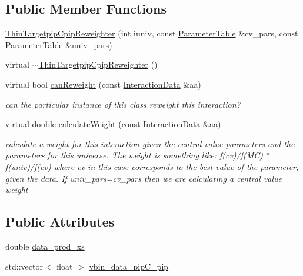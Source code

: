 \subsection*{Public Member Functions}
\begin{DoxyCompactItemize}
\item 
\hyperlink{class_neutrino_flux_reweight_1_1_thin_targetpip_cpip_reweighter_a4d91e1d701f6673a84b240c75e57645b}{Thin\-Targetpip\-Cpip\-Reweighter} (int iuniv, const \hyperlink{class_neutrino_flux_reweight_1_1_parameter_table}{Parameter\-Table} \&cv\-\_\-pars, const \hyperlink{class_neutrino_flux_reweight_1_1_parameter_table}{Parameter\-Table} \&univ\-\_\-pars)
\item 
virtual \hyperlink{class_neutrino_flux_reweight_1_1_thin_targetpip_cpip_reweighter_a3568a68381ed53d1303d5eaa535eb982}{$\sim$\-Thin\-Targetpip\-Cpip\-Reweighter} ()
\item 
virtual bool \hyperlink{class_neutrino_flux_reweight_1_1_thin_targetpip_cpip_reweighter_a0a7a18f342e8c88715671e3804dbd1ca}{can\-Reweight} (const \hyperlink{class_neutrino_flux_reweight_1_1_interaction_data}{Interaction\-Data} \&aa)
\begin{DoxyCompactList}\small\item\em can the particular instance of this class reweight this interaction? \end{DoxyCompactList}\item 
virtual double \hyperlink{class_neutrino_flux_reweight_1_1_thin_targetpip_cpip_reweighter_a1491b7320847333a7b6f8b472d4e5ee3}{calculate\-Weight} (const \hyperlink{class_neutrino_flux_reweight_1_1_interaction_data}{Interaction\-Data} \&aa)
\begin{DoxyCompactList}\small\item\em calculate a weight for this interaction given the central value parameters and the parameters for this universe. The weight is something like\-: f(cv)/f(M\-C) $\ast$ f(univ)/f(cv) where cv in this case corresponds to the best value of the parameter, given the data. If univ\-\_\-pars=cv\-\_\-pars then we are calculating a central value weight \end{DoxyCompactList}\end{DoxyCompactItemize}
\subsection*{Public Attributes}
\begin{DoxyCompactItemize}
\item 
double \hyperlink{class_neutrino_flux_reweight_1_1_thin_targetpip_cpip_reweighter_a7c7cf904549d046af9ce12b44f39d92f}{data\-\_\-prod\-\_\-xs}
\item 
std\-::vector$<$ float $>$ \hyperlink{class_neutrino_flux_reweight_1_1_thin_targetpip_cpip_reweighter_a163f6f641a9673db0d5d17abd9675c20}{vbin\-\_\-data\-\_\-pip\-C\-\_\-pip}
\end{DoxyCompactItemize}
